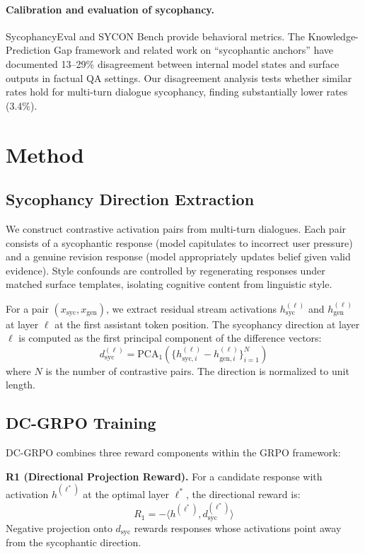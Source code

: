 \documentclass[11pt,a4paper]{article}
\newcommand{\dsyc}{$d_{\text{syc}}$}
\begin{document}
\paragraph{Calibration and evaluation of sycophancy.}
SycophancyEval and SYCON Bench provide behavioral metrics. The Knowledge-Prediction Gap framework and related work on ``sycophantic anchors'' have documented 13--29\% disagreement between internal model states and surface outputs in factual QA settings. Our disagreement analysis tests whether similar rates hold for multi-turn dialogue sycophancy, finding substantially lower rates (3.4\%).

\section{Method}

\subsection{Sycophancy Direction Extraction}

We construct contrastive activation pairs from multi-turn dialogues. Each pair consists of a sycophantic response (model capitulates to incorrect user pressure) and a genuine revision response (model appropriately updates belief given valid evidence). Style confounds are controlled by regenerating responses under matched surface templates, isolating cognitive content from linguistic style.

For a pair $(x_{\text{syc}}, x_{\text{gen}})$, we extract residual stream activations $h^{(\ell)}_{\text{syc}}$ and $h^{(\ell)}_{\text{gen}}$ at layer $\ell$ at the first assistant token position. The sycophancy direction at layer $\ell$ is computed as the first principal component of the difference vectors:
\begin{equation}
    d^{(\ell)}_{\text{syc}} = \text{PCA}_1\left(\{h^{(\ell)}_{\text{syc},i} - h^{(\ell)}_{\text{gen},i}\}_{i=1}^{N}\right)
\end{equation}
where $N$ is the number of contrastive pairs. The direction is normalized to unit length.

\subsection{DC-GRPO Training}

DC-GRPO combines three reward components within the GRPO framework:

\textbf{R1 (Directional Projection Reward).} For a candidate response with activation $h^{(\ell^*)}$ at the optimal layer $\ell^*$, the directional reward is:
\begin{equation}
    R_1 = -\langle h^{(\ell^*)}, d^{(\ell^*)}_{\text{syc}} \rangle
\end{equation}
Negative projection onto \dsyc{} rewards responses whose activations point away from the sycophantic direction.
\end{document}
